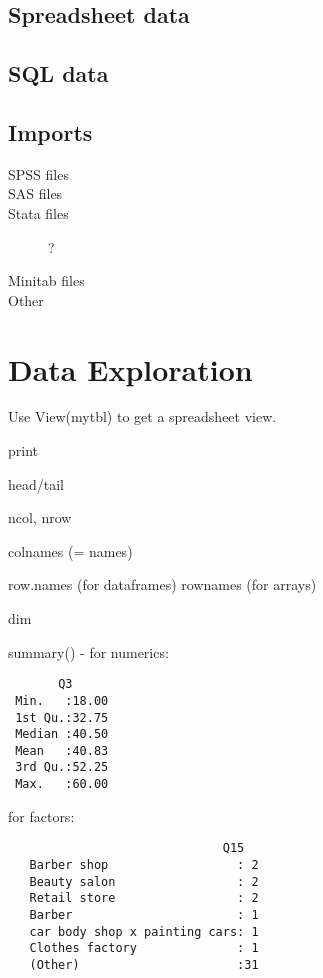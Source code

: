 \subsection{Spreadsheet data}
\subsection{SQL data}
\subsection{Imports}

\begin{description}
  \item [SPSS files]
  \item [SAS files]
  \item [Stata files] ?
  \item [Minitab files]
  \item [Other]
\end{description}

\section{Data Exploration}

Use View(mytbl) to get a spreadsheet view.

print

head/tail

ncol, nrow

colnames (= names)

row.names (for dataframes)
rownames (for arrays)

dim

summary() - for numerics:
\begin{verbatim}
       Q3                                
 Min.   :18.00                           
 1st Qu.:32.75                           
 Median :40.50                           
 Mean   :40.83                           
 3rd Qu.:52.25                           
 Max.   :60.00  
\end{verbatim}

for factors:
\begin{verbatim}
                              Q15    
   Barber shop                  : 2  
   Beauty salon                 : 2  
   Retail store                 : 2              
   Barber                       : 1              
   car body shop x painting cars: 1              
   Clothes factory              : 1              
   (Other)                      :31              
\end{verbatim}


